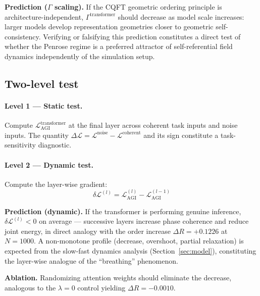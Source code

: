 \documentclass[12pt,a4paper]{article}
\theoremstyle{plain}
\theoremstyle{definition}
\begin{document}
\begin{keyresult}
\textbf{Prediction ($\Gamma$ scaling).} If the CQFT geometric ordering
principle is architecture-independent, $\Gamma^{\text{transformer}}$
should decrease as model scale increases: larger models develop
representation geometries closer to geometric self-consistency. Verifying
or falsifying this prediction constitutes a direct test of whether the
Penrose regime is a preferred attractor of self-referential field dynamics
independently of the simulation setup.
\end{keyresult}

\subsection{Two-level test}
\label{subsec:two_level}

\paragraph{Level 1 --- Static test.}
Compute $\mathcal{L}_{\text{AGI}}^{\text{transformer}}$ at the final
layer across coherent task inputs and noise inputs. The quantity
$\Delta\mathcal{L} = \mathcal{L}^{\text{noise}} -
\mathcal{L}^{\text{coherent}}$ and its sign constitute a
task-sensitivity diagnostic.

\paragraph{Level 2 --- Dynamic test.}
Compute the layer-wise gradient:
\begin{equation}
\label{eq:delta_L}
\delta\mathcal{L}^{(l)} = \mathcal{L}_{\text{AGI}}^{(l)}
                         - \mathcal{L}_{\text{AGI}}^{(l-1)}
\end{equation}

\begin{keyresult}
\textbf{Prediction (dynamic).} If the transformer is performing genuine
inference, $\delta\mathcal{L}^{(l)} < 0$ on average --- successive
layers increase phase coherence and reduce joint energy, in direct
analogy with the order increase $\Delta R = +0.1226$ at $N = 1000$.
A non-monotone profile (decrease, overshoot, partial relaxation) is
expected from the slow-fast dynamics analysis
(Section~\ref{sec:model}), constituting the layer-wise analogue of the
``breathing'' phenomenon.

\textbf{Ablation.} Randomizing attention weights should eliminate the
decrease, analogous to the $\lambda = 0$ control yielding
$\Delta R = -0.0010$.
\end{keyresult}
\end{document}
